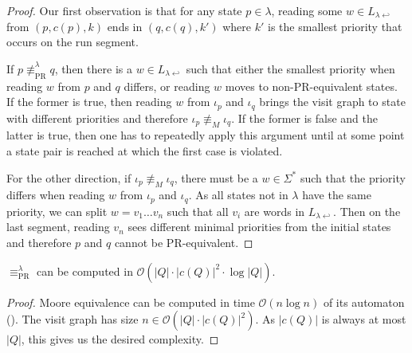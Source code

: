 \begin{proof}
	Our first observation is that for any state $p \in \lambda$, reading some $w \in L_{\lambda \hookleftarrow}$ from $(p, c(p), k)$ ends in $(q, c(q), k')$ where $k'$ is the smallest priority that occurs on the run segment.
	
	If $p \not\equiv_\text{PR}^\lambda q$, then there is a $w \in L_{\lambda \hookleftarrow}$ such that either the smallest priority when reading $w$ from $p$ and $q$ differs, or reading $w$ moves to non-PR-equivalent states. If the former is true, then reading $w$ from $\iota_p$ and $\iota_q$ brings the visit graph to state with different priorities and therefore $\iota_p \not\equiv_M \iota_q$. If the former is false and the latter is true, then one has to repeatedly apply this argument until at some point a state pair is reached at which the first case is violated.
	
	For the other direction, if $\iota_p \not\equiv_M \iota_q$, there must be a $w \in \Sigma^*$ such that the priority differs when reading $w$ from $\iota_p$ and $\iota_q$. As all states not in $\lambda$ have the same priority, we can split $w = v_1 \dots v_n$ such that all $v_i$ are words in $L_{\lambda \hookleftarrow}$. Then on the last segment, reading $v_n$ sees different minimal priorities from the initial states and therefore $p$ and $q$ cannot be PR-equivalent.
\end{proof}

\begin{theorem}
	$\equiv_\text{PR}^\lambda$ can be computed in $\mathcal{O}(|Q| \cdot |c(Q)|^2 \cdot \log |Q|)$.
\end{theorem}

\begin{proof}
	Moore equivalence can be computed in time $\mathcal{O}(n \log n)$ of its automaton (\cite{Hopcroft1971}). The visit graph has size $n \in \mathcal{O}(|Q| \cdot |c(Q)|^2)$. As $|c(Q)|$ is always at most $|Q|$, this gives us the desired complexity.
\end{proof}